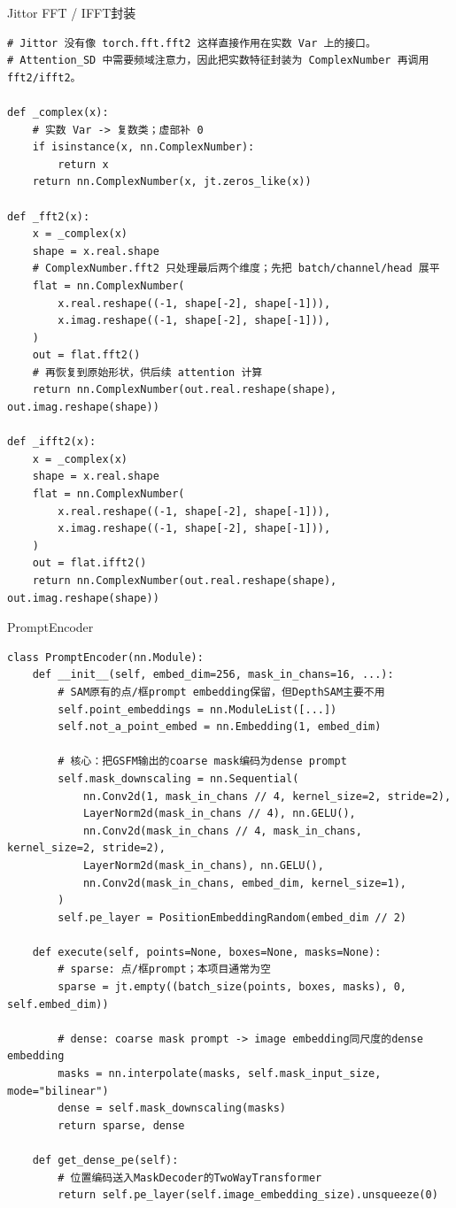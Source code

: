 \begin{frame}[fragile]{Jittor FFT / IFFT封装}
\begin{lstlisting}[style=pythoncode,basicstyle=\ttfamily\tiny]
# Jittor 没有像 torch.fft.fft2 这样直接作用在实数 Var 上的接口。
# Attention_SD 中需要频域注意力，因此把实数特征封装为 ComplexNumber 再调用 fft2/ifft2。

def _complex(x):
    # 实数 Var -> 复数类；虚部补 0
    if isinstance(x, nn.ComplexNumber):
        return x
    return nn.ComplexNumber(x, jt.zeros_like(x))

def _fft2(x):
    x = _complex(x)
    shape = x.real.shape
    # ComplexNumber.fft2 只处理最后两个维度；先把 batch/channel/head 展平
    flat = nn.ComplexNumber(
        x.real.reshape((-1, shape[-2], shape[-1])),
        x.imag.reshape((-1, shape[-2], shape[-1])),
    )
    out = flat.fft2()
    # 再恢复到原始形状，供后续 attention 计算
    return nn.ComplexNumber(out.real.reshape(shape), out.imag.reshape(shape))

def _ifft2(x):
    x = _complex(x)
    shape = x.real.shape
    flat = nn.ComplexNumber(
        x.real.reshape((-1, shape[-2], shape[-1])),
        x.imag.reshape((-1, shape[-2], shape[-1])),
    )
    out = flat.ifft2()
    return nn.ComplexNumber(out.real.reshape(shape), out.imag.reshape(shape))
\end{lstlisting}
\end{frame}

\begin{frame}[fragile]{PromptEncoder}
\begin{lstlisting}[style=pythoncode,basicstyle=\ttfamily\tiny]
class PromptEncoder(nn.Module):
    def __init__(self, embed_dim=256, mask_in_chans=16, ...):
        # SAM原有的点/框prompt embedding保留，但DepthSAM主要不用
        self.point_embeddings = nn.ModuleList([...])
        self.not_a_point_embed = nn.Embedding(1, embed_dim)

        # 核心：把GSFM输出的coarse mask编码为dense prompt
        self.mask_downscaling = nn.Sequential(
            nn.Conv2d(1, mask_in_chans // 4, kernel_size=2, stride=2),
            LayerNorm2d(mask_in_chans // 4), nn.GELU(),
            nn.Conv2d(mask_in_chans // 4, mask_in_chans, kernel_size=2, stride=2),
            LayerNorm2d(mask_in_chans), nn.GELU(),
            nn.Conv2d(mask_in_chans, embed_dim, kernel_size=1),
        )
        self.pe_layer = PositionEmbeddingRandom(embed_dim // 2)

    def execute(self, points=None, boxes=None, masks=None):
        # sparse: 点/框prompt；本项目通常为空
        sparse = jt.empty((batch_size(points, boxes, masks), 0, self.embed_dim))

        # dense: coarse mask prompt -> image embedding同尺度的dense embedding
        masks = nn.interpolate(masks, self.mask_input_size, mode="bilinear")
        dense = self.mask_downscaling(masks)
        return sparse, dense

    def get_dense_pe(self):
        # 位置编码送入MaskDecoder的TwoWayTransformer
        return self.pe_layer(self.image_embedding_size).unsqueeze(0)
\end{lstlisting}
\end{frame}

